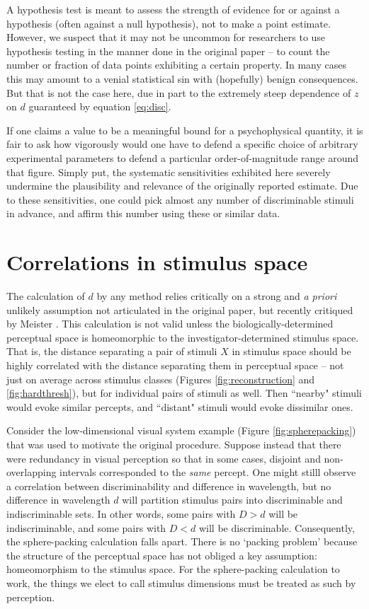 \documentclass[letterpaper,twocolumn,10pt]{article}
\begin{document}
A hypothesis test is meant to assess the strength of evidence for or against a hypothesis (often against a null hypothesis), not to make a point estimate.  
However, we suspect that it may not be uncommon for researchers to use hypothesis testing in the manner done in the original paper -- 
to count the number or fraction of data points exhibiting a certain property.  
In many cases this may amount to a venial statistical sin with (hopefully) benign consequences.  
But that is not the case here, due in part to the extremely steep dependence of $z$ on $d$ guaranteed by equation \ref{eq:disc}. 

If one claims a value to be a meaningful bound for a psychophysical quantity, 
it is fair to ask how vigorously would one have to defend a specific choice of arbitrary experimental parameters to defend a particular order-of-magnitude range around that figure. 
Simply put, the systematic sensitivities exhibited here severely undermine the plausibility and relevance of the originally reported estimate. 
Due to these sensitivities, one could pick almost any number of discriminable stimuli in advance, 
and affirm this number using these or similar data. 

\section{Correlations in stimulus space}
\label{correlations}

The calculation of $d$ by any method relies critically on a strong and \textit{a priori} unlikely assumption not articulated in the original paper, 
but recently critiqued by Meister \cite{meister_can_2014}. 
This calculation is not valid unless the biologically-determined perceptual space is homeomorphic to the investigator-determined stimulus space. 
That is, the distance separating a pair of stimuli $X$ in stimulus space should be highly correlated with the distance separating them in perceptual space -- 
not just on average across stimulus classes (Figures \ref{fig:reconstruction} and \ref{fig:hardthresh}), but for individual pairs of stimuli as well.  Then ``nearby" stimuli would evoke similar percepts, and ``distant" stimuli would evoke dissimilar ones.  

Consider the low-dimensional visual system example (Figure \ref{fig:spherepacking}) that was used to motivate the original procedure. 
Suppose instead that there were redundancy in visual perception so that in some cases, 
disjoint and non-overlapping intervals corresponded to the \textit{same} percept.
One might stilll observe a correlation between discriminability and difference in wavelength, 
but no difference in wavelength $d$ will partition stimulus pairs into discriminable and indiscriminable sets. 
In other words, some pairs with $D>d$ will be indiscriminable, 
and some pairs with $D<d$ will be discriminable. 
Consequently, the sphere-packing calculation falls apart. 
There is no `packing problem' because the structure of the perceptual space has not obliged a key assumption: 
homeomorphism to the stimulus space. 
For the sphere-packing calculation to work, 
the things we elect to call stimulus dimensions must be treated as such by perception. 
\end{document}
